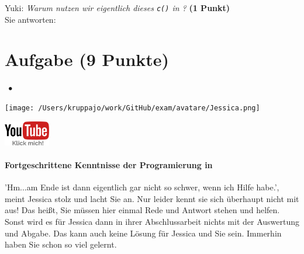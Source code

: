 \documentclass[a4paper, 9pt]{scrartcl}\usepackage[]{graphicx}\usepackage[]{xcolor}
\begin{document}
Yuki: \textit{Warum nutzen wir eigentlich dieses \texttt{c()} in \Rlogo?} \textbf{(1 Punkt)}\\[1ex]
Sie antworten:\\[3Ex] 
\clearpage

\section{Aufgabe \hfill (9 Punkte)}



 
\ifcollection
\begin{flushright}
\tiny\vspace{-3Ex}
\textbf{\examinhaltstart}
\exammodulestatversuch $\;\bullet$
\exammodulebiostat
\vspace{-4Ex}
\end{flushright}
\begin{minipage}[t]{0.5\textwidth}
\texttt{[image: /Users/kruppajo/work/GitHub/exam/avatare/Jessica.png]}
\end{minipage}
\begin{minipage}[t]{0.5\textwidth}
\hfill
\href{https://www.youtube.com/playlist?list=PLe51bCp9JvEFUnFqaJG5aRmON9i1ZbOYC}{\includegraphics[width = 2cm]{img/youtube}}
\end{minipage}
\vspace{1ex}
\fi



\ifcollection
\paragraph{Fortgeschrittene Kenntnisse der Programierung in \Rlogo}
\fi

'Hm...am Ende ist dann \Rlogo eigentlich gar nicht so schwer, wenn ich Hilfe habe.', meint  Jessica stolz und lacht Sie an. Nur leider kennt sie sich überhaupt nicht mit \Rlogo aus! Das heißt, Sie müssen hier einmal Rede und Antwort stehen und helfen. Sonst wird es für Jessica dann in ihrer Abschlussarbeit nichts mit der Auswertung und Abgabe. Das kann auch keine Lösung für Jessica und Sie sein. Immerhin haben Sie schon so viel gelernt.\\[1Ex]
\end{document}
